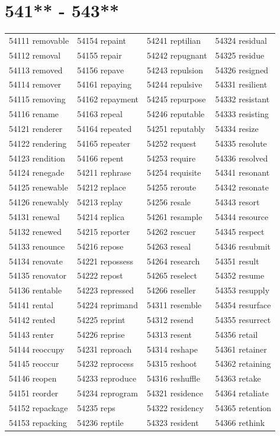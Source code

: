 \documentclass[10pt, oneside]{book}
\begin{document}
\begin{table}
	\centering
	\section*{541** - 543**}
	\begin{tabular}{l l l l}
54111 removable &54154 repaint &54241 reptilian &54324 residual\\
54112 removal &54155 repair &54242 repugnant &54325 residue\\
54113 removed &54156 repave &54243 repulsion &54326 resigned\\
54114 remover &54161 repaying &54244 repulsive &54331 resilient\\
54115 removing &54162 repayment &54245 repurpose &54332 resistant\\
54116 rename &54163 repeal &54246 reputable &54333 resisting\\
54121 renderer &54164 repeated &54251 reputably &54334 resize\\
54122 rendering &54165 repeater &54252 request &54335 resolute\\
54123 rendition &54166 repent &54253 require &54336 resolved\\
54124 renegade &54211 rephrase &54254 requisite &54341 resonant\\
54125 renewable &54212 replace &54255 reroute &54342 resonate\\
54126 renewably &54213 replay &54256 resale &54343 resort\\
54131 renewal &54214 replica &54261 resample &54344 resource\\
54132 renewed &54215 reporter &54262 rescuer &54345 respect\\
54133 renounce &54216 repose &54263 reseal &54346 resubmit\\
54134 renovate &54221 repossess &54264 research &54351 result\\
54135 renovator &54222 repost &54265 reselect &54352 resume\\
54136 rentable &54223 repressed &54266 reseller &54353 resupply\\
54141 rental &54224 reprimand &54311 resemble &54354 resurface\\
54142 rented &54225 reprint &54312 resend &54355 resurrect\\
54143 renter &54226 reprise &54313 resent &54356 retail\\
54144 reoccupy &54231 reproach &54314 reshape &54361 retainer\\
54145 reoccur &54232 reprocess &54315 reshoot &54362 retaining\\
54146 reopen &54233 reproduce &54316 reshuffle &54363 retake\\
54151 reorder &54234 reprogram &54321 residence &54364 retaliate\\
54152 repackage &54235 reps &54322 residency &54365 retention\\
54153 repacking &54236 reptile &54323 resident &54366 rethink\\
	\end{tabular}
 \end{table}
\clearpage
\end{document}
